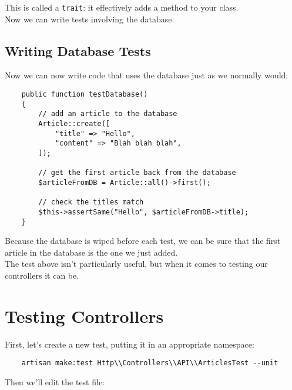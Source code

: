 This is called a \texttt{trait}: it effectively adds a method to your class.
\\

Now we can write tests involving the database.


\subsection{Writing Database Tests}

Now we can now write code that uses the database just as we normally would:

\begin{verbatim}
    public function testDatabase()
    {
        // add an article to the database
        Article::create([
            "title" => "Hello",
            "content" => "Blah blah blah",
        ]);

        // get the first article back from the database
        $articleFromDB = Article::all()->first();

        // check the titles match
        $this->assertSame("Hello", $articleFromDB->title);
    }
\end{verbatim}

Because the database is wiped before each test, we can be sure that the first article in the database is the one we just added.
\\

The test above isn't particularly useful, but when it comes to testing our controllers it can be.


\pagebreak


\section{Testing Controllers}

First, let's create a new test, putting it in an appropriate namespace:

\begin{verbatim}
    artisan make:test Http\\Controllers\\API\\ArticlesTest --unit
\end{verbatim}

Then we'll edit the test file:

